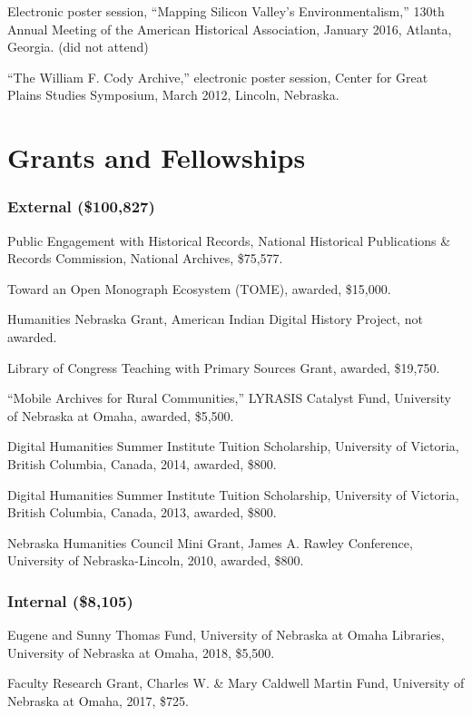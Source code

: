 Electronic poster session, ``Mapping Silicon Valley's
Environmentalism,'' 130th Annual Meeting of the American Historical
Association, January 2016, Atlanta, Georgia. (did not attend)

``The William F. Cody Archive,'' electronic poster session, Center for
Great Plains Studies Symposium, March 2012, Lincoln, Nebraska.

\section{Grants and Fellowships}\label{grants-and-fellowships}

\subsubsection{External (\$100,827)}\label{external-100827}

Public Engagement with Historical Records, National Historical
Publications \& Records Commission, National Archives, \$75,577.

Toward an Open Monograph Ecosystem (TOME), awarded, \$15,000.

Humanities Nebraska Grant, American Indian Digital History Project, not
awarded.

Library of Congress Teaching with Primary Sources Grant, awarded,
\$19,750.

``Mobile Archives for Rural Communities,'' LYRASIS Catalyst Fund,
University of Nebraska at Omaha, awarded, \$5,500.

Digital Humanities Summer Institute Tuition Scholarship, University of
Victoria, British Columbia, Canada, 2014, awarded, \$800.

Digital Humanities Summer Institute Tuition Scholarship, University of
Victoria, British Columbia, Canada, 2013, awarded, \$800.

Nebraska Humanities Council Mini Grant, James A. Rawley Conference,
University of Nebraska-Lincoln, 2010, awarded, \$800.

\subsubsection{Internal (\$8,105)}\label{internal-8105}

Eugene and Sunny Thomas Fund, University of Nebraska at Omaha Libraries,
University of Nebraska at Omaha, 2018, \$5,500.

Faculty Research Grant, Charles W. \& Mary Caldwell Martin Fund,
University of Nebraska at Omaha, 2017, \$725.

